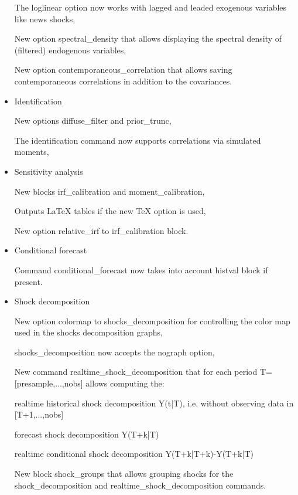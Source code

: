 \documentclass[10pt,math=newtx,citestyle=gb7714-2015,bibstyle=gb7714-2015]{elegantbook}
\begin{document}
\begin{itemize}
		
		The loglinear option now works with lagged and leaded exogenous variables like news shocks,
		
		
		New option spectral\_density that allows displaying the spectral density of (filtered) endogenous variables,
		
		
		New option contemporaneous\_correlation that allows saving contemporaneous correlations in addition to the covariances.
		
		
		
		
		\item Identification
		
		
		New options diffuse\_filter and prior\_trunc,
		
		
		The identification command now supports correlations via simulated moments,
		
		
		
		
		\item Sensitivity analysis
		
		
		New blocks irf\_calibration and moment\_calibration,
		
		
		Outputs LaTeX tables if the new TeX option is used,
		
		
		New option relative\_irf to irf\_calibration block.
		
		
		
		
		\item Conditional forecast
		
		Command conditional\_forecast now takes into account histval block if present.
		
		
		
		\item Shock decomposition
		
		
		New option colormap to shocks\_decomposition for controlling the color map used in the shocks decomposition graphs,
		
		
		shocks\_decomposition now accepts the nograph option,
		
		
		New command realtime\_shock\_decomposition that for each period T= [presample,...,nobs] allows computing the:
		
		
		realtime historical shock decomposition Y(t|T), i.e. without observing data in [T+1,...,nobs]
		
		
		forecast shock decomposition Y(T+k|T)
		
		
		realtime conditional shock decomposition Y(T+k|T+k)-Y(T+k|T)
		
		
		
		
       New block shock\_groups that allows grouping shocks for the shock\_decomposition and realtime\_shock\_decomposition commands.
		

\end{itemize}
\end{document}
